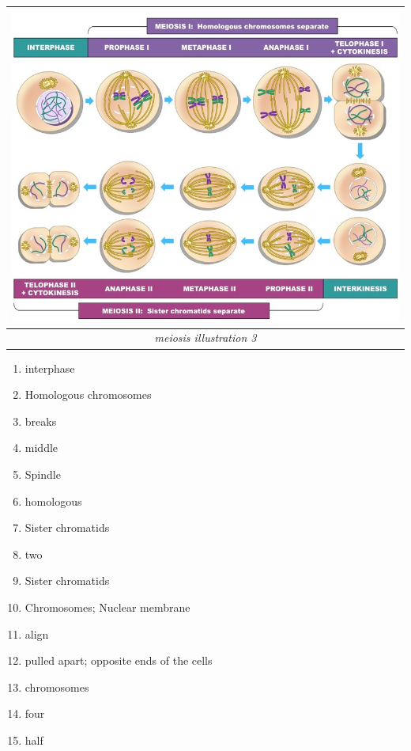 \documentclass[
]{book}
\providecommand{\tightlist}{%
  \setlength{\itemsep}{0pt}\setlength{\parskip}{0pt}}
\begin{document}
\begin{longtable}[]{@{}c@{}}
\toprule\noalign{}
\includegraphics{./img/meiosis-complex_med.jpeg} \\
\midrule\noalign{}
\endhead
\bottomrule\noalign{}
\endlastfoot
\emph{meiosis illustration 3} \\
\end{longtable}

\begin{enumerate}
\def\labelenumi{\arabic{enumi}.}
\tightlist
\item
  interphase\\
\item
  Homologous chromosomes\\
\item
  breaks\\
\item
  middle\\
\item
  Spindle\\
\item
  homologous\\
\item
  Sister chromatids\\
\item
  two\\
\item
  Sister chromatids\\
\item
  Chromosomes; Nuclear membrane\\
\item
  align\\
\item
  pulled apart; opposite ends of the cells\\
\item
  chromosomes\\
\item
  four\\
\item
  half
\end{enumerate}
\end{document}
